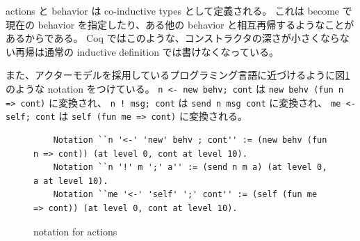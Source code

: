 actions と behavior は co-inductive types として定義される。
これは become で現在の behavior を指定したり、ある他の behavior と相互再帰するようなことがあるからである。
Coq ではこのような、コンストラクタの深さが小さくならない再帰は通常の inductive definition では書けなくなっている。

また、アクターモデルを採用しているプログラミング言語に近づけるように図\ref{coq:notation}のような notation をつけている。
\texttt{n <- new behv; cont} は \texttt{new behv (fun n => cont)} に変換され、
\texttt{n ! msg; cont} は \texttt{send n msg cont} に変換され、
\texttt{me <- self; cont} は \texttt{self (fun me => cont)} に変換される。

\begin{figure}[tb]
  \begin{lstlisting}
    Notation ``n '<-' 'new' behv ; cont'' := (new behv (fun n => cont)) (at level 0, cont at level 10).
    Notation ``n '!' m ';' a'' := (send n m a) (at level 0, a at level 10).
    Notation ``me '<-' 'self' ';' cont'' := (self (fun me => cont)) (at level 0, cont at level 10).
  \end{lstlisting}
  \caption{notation for actions}\label{coq:notation}
\end{figure}
